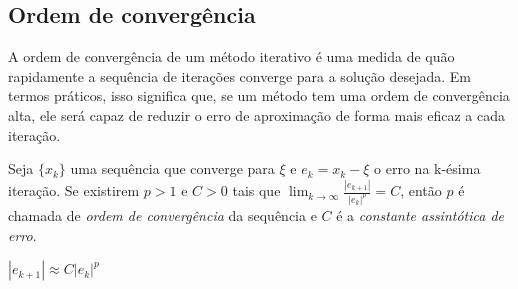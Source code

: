 
\subsection{Ordem de convergência}

A ordem de convergência de um método iterativo é uma medida de quão
rapidamente a sequência de iterações converge para a solução desejada. Em termos
práticos, isso significa que, se um método tem uma ordem de convergência alta, ele
será capaz de reduzir o erro de aproximação de forma mais eficaz a cada iteração.
\begin{df}
    Seja $\{x_k\}$ uma sequência que converge para $\xi$ e $e_k = x_k - \xi$ o erro na k-ésima iteração.
    Se existirem $p > 1$ e $C > 0$ tais que $\lim_{k \to \infty} \frac{|e_{k+1}|}{|e_k|^p} = C$, então $p$ é chamada de \emph{ordem de convergência} da sequência e $C$ é a \emph{constante assintótica de erro}.
\end{df}

$|e_{k+1}| \approx C |e_k|^p$

